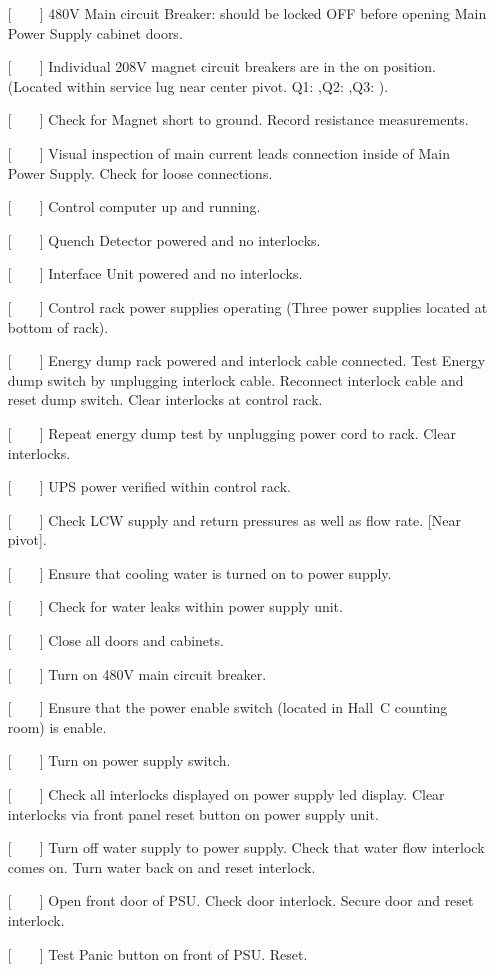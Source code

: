 \begin{itemize}
\item[{[~~~~]}]{480V Main circuit Breaker:  should be locked OFF
before opening Main Power Supply cabinet doors.}
\item[{[~~~~]}]{Individual 208V magnet circuit breakers are in the on
position.  (Located within service lug near center pivot.
Q1:\hskip0.3in ,Q2:\hskip0.3in ,Q3:\hskip0.3in ).}
\item[{[~~~~]}]{Check for Magnet short to ground. Record resistance measurements.}
\item[{[~~~~]}]{Visual inspection of main current leads connection inside of
Main Power Supply. Check for loose connections.}
\item[{[~~~~]}]{Control computer up and running.}
\item[{[~~~~]}]{Quench Detector powered and no interlocks.}
\item[{[~~~~]}]{Interface Unit powered and no interlocks.}
\item[{[~~~~]}]{Control rack power supplies operating  (Three power supplies
located at bottom of rack).}
\item[{[~~~~]}]{Energy dump rack powered and interlock cable connected. Test
Energy dump switch by unplugging interlock cable. Reconnect interlock cable
and reset dump switch. Clear interlocks at control rack.}
\item[{[~~~~]}]{Repeat energy dump test by unplugging power cord to rack.
Clear interlocks.}
\item[{[~~~~]}]{UPS power verified within control rack.}
\item[{[~~~~]}]{Check LCW supply and return pressures as well as flow rate.
[Near pivot].}
\item[{[~~~~]}]{Ensure that cooling water is turned on to power supply.}
\item[{[~~~~]}]{Check for water leaks within power supply unit.}
\item[{[~~~~]}]{Close all doors and cabinets.}
\item[{[~~~~]}]{Turn on 480V main circuit breaker.}
\item[{[~~~~]}]{Ensure that the power enable switch (located in Hall~C
counting room) is enable.}
\item[{[~~~~]}]{Turn on power supply switch.}
\item[{[~~~~]}]{Check all interlocks displayed on power supply led display.
Clear interlocks via front panel reset button on power supply unit.}
\item[{[~~~~]}]{Turn off water supply to power supply. Check that water
flow interlock comes on. Turn water back on and reset interlock.}
\item[{[~~~~]}]{Open front door of PSU. Check door interlock. Secure door and
reset interlock.}
\item[{[~~~~]}]{Test Panic button on front of PSU. Reset.}
\end{itemize}


